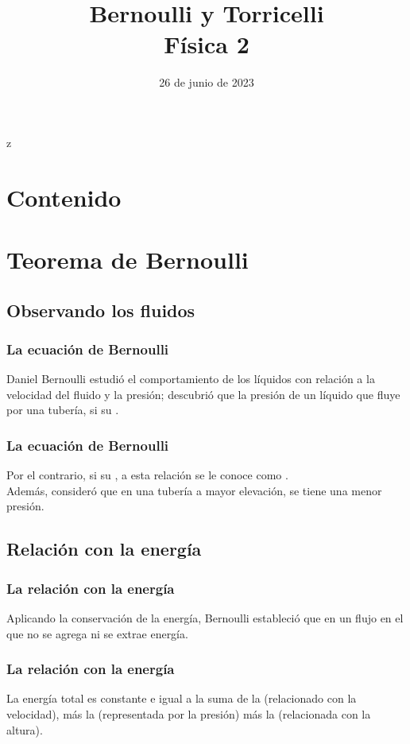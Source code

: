 z\documentclass[14pt]{beamer}
\title{\Large{Bernoulli y Torricelli} \\ \normalsize{Física 2}}
\date{26 de junio de 2023}
\begin{document}
\maketitle

\section*{Contenido}

\section{Teorema de Bernoulli}
\subsection{Observando los fluidos}

\begin{frame}
\frametitle{La ecuación de Bernoulli}
Daniel Bernoulli estudió el comportamiento de los líquidos con relación a la velocidad del fluido y la presión; descubrió que la presión de un líquido que fluye por una tubería,  si su .
\end{frame}
\begin{frame}
\frametitle{La ecuación de Bernoulli}
Por el contrario,  si su , \pause a esta relación se le conoce como .
\\
\bigskip
\pause
Además, consideró que en una tubería a mayor elevación, se tiene una menor presión.
\end{frame}

\subsection{Relación con la energía}

\begin{frame}
\frametitle{La relación con la energía}
Aplicando la conservación de la energía, Bernoulli estableció que en un flujo en el que no se agrega ni se extrae energía.
\end{frame}
\begin{frame}
\frametitle{La relación con la energía}
La energía total es constante e igual a la suma de la  (relacionado con la velocidad), \pause más la  (representada por la presión) \pause más la  (relacionada con la altura).
\end{frame}
\end{document}
